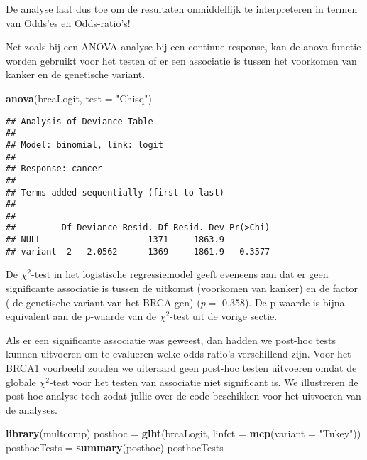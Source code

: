 \documentclass[12pt,dutch,coursenotes]{book}
\newenvironment{Shaded}{\begin{snugshade}}{\end{snugshade}}
\newcommand{\KeywordTok}[1]{\textcolor[rgb]{0.13,0.29,0.53}{\textbf{#1}}}
\newcommand{\DataTypeTok}[1]{\textcolor[rgb]{0.13,0.29,0.53}{#1}}
\newcommand{\StringTok}[1]{\textcolor[rgb]{0.31,0.60,0.02}{#1}}
\newcommand{\NormalTok}[1]{#1}
\theoremstyle{definition}
\theoremstyle{definition}
\theoremstyle{definition}
\theoremstyle{remark}
\begin{document}
De analyse laat dus toe om de resultaten onmiddellijk te interpreteren
in termen van Odds'es en Odds-ratio's!

Net zoals bij een ANOVA analyse bij een continue response, kan de anova
functie worden gebruikt voor het testen of er een associatie is tussen
het voorkomen van kanker en de genetische variant.

\begin{Shaded}
\begin{Highlighting}[]
\KeywordTok{anova}\NormalTok{(brcaLogit, }\DataTypeTok{test =} \StringTok{"Chisq"}\NormalTok{)}
\end{Highlighting}
\end{Shaded}

\begin{verbatim}
## Analysis of Deviance Table
## 
## Model: binomial, link: logit
## 
## Response: cancer
## 
## Terms added sequentially (first to last)
## 
## 
##         Df Deviance Resid. Df Resid. Dev Pr(>Chi)
## NULL                     1371     1863.9         
## variant  2   2.0562      1369     1861.9   0.3577
\end{verbatim}

De \(\chi^2\)-test in het logistische regressiemodel geeft eveneens aan
dat er geen significante associatie is tussen de uitkomst (voorkomen van
kanker) en de factor ( de genetische variant van het BRCA gen) (\(p=\)
0.358). De p-waarde is bijna equivalent aan de p-waarde van de
\(\chi^2\)-test uit de vorige sectie.

Als er een significante associatie was geweest, dan hadden we post-hoc
tests kunnen uitvoeren om te evalueren welke odds ratio's verschillend
zijn. Voor het BRCA1 voorbeeld zouden we uiteraard geen post-hoc testen
uitvoeren omdat de globale \(\chi^2\)-test voor het testen van
associatie niet significant is. We illustreren de post-hoc analyse toch
zodat jullie over de code beschikken voor het uitvoeren van de analyses.

\begin{Shaded}
\begin{Highlighting}[]
\KeywordTok{library}\NormalTok{(multcomp)}
\NormalTok{posthoc =}\StringTok{ }\KeywordTok{glht}\NormalTok{(brcaLogit, }\DataTypeTok{linfct =} \KeywordTok{mcp}\NormalTok{(}\DataTypeTok{variant =} \StringTok{"Tukey"}\NormalTok{))}
\NormalTok{posthocTests =}\StringTok{ }\KeywordTok{summary}\NormalTok{(posthoc)}
\NormalTok{posthocTests}
\end{Highlighting}
\end{Shaded}
\end{document}
